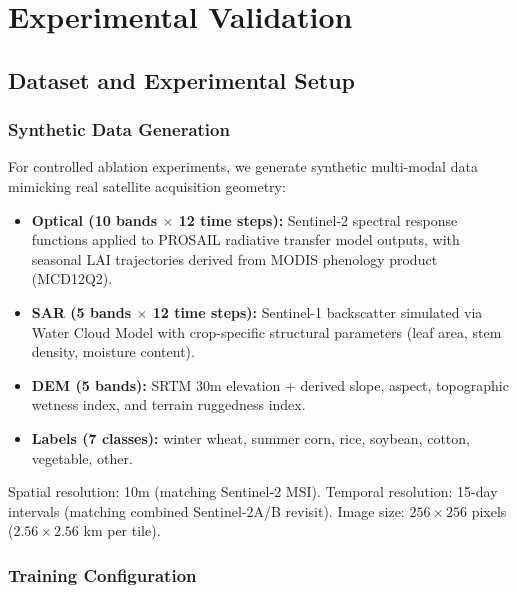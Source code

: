 \section{Experimental Validation}

\subsection{Dataset and Experimental Setup}

\subsubsection{Synthetic Data Generation}

For controlled ablation experiments, we generate synthetic multi-modal data
mimicking real satellite acquisition geometry:

\begin{itemize}
    \item \textbf{Optical (10 bands $\times$ 12 time steps):} Sentinel-2 spectral
    response functions applied to PROSAIL radiative transfer model outputs,
    with seasonal LAI trajectories derived from MODIS phenology product (MCD12Q2).
    \item \textbf{SAR (5 bands $\times$ 12 time steps):} Sentinel-1 backscatter
    simulated via Water Cloud Model with crop-specific structural parameters
    (leaf area, stem density, moisture content).
    \item \textbf{DEM (5 bands):} SRTM 30m elevation + derived slope, aspect,
    topographic wetness index, and terrain ruggedness index.
    \item \textbf{Labels (7 classes):} winter wheat, summer corn, rice, soybean,
    cotton, vegetable, other.
\end{itemize}

Spatial resolution: 10m (matching Sentinel-2 MSI). Temporal resolution: 15-day
intervals (matching combined Sentinel-2A/B revisit). Image size: $256 \times 256$
pixels ($2.56 \times 2.56$ km per tile).

\subsubsection{Training Configuration}

